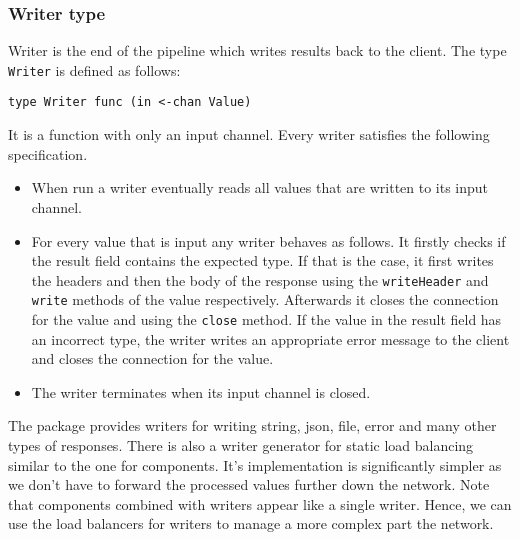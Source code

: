 \subsubsection{Writer type}
Writer is the end of the pipeline which writes results back to the client.
The type \texttt{Writer} is defined as follows:
\begin{lstlisting}
type Writer func (in <-chan Value)
\end{lstlisting}
It is a function with only an input channel.
Every writer satisfies the following specification.
\begin{itemize}
    \item When run a writer eventually reads all values that are written 
          to its input channel.

	\item For every value that is input any writer behaves as follows. 
        It firstly checks if the result field contains the expected type. 
        If that is the case, it first writes the headers and then
        the body of the response using the \texttt{writeHeader} and
        \texttt{write} methods of the value respectively. 
        Afterwards it closes the connection for the value and using 
        the \texttt{close} method. If the value in the result 
        field has an incorrect type, the writer writes an appropriate 
        error message to the client and closes the connection for the value. 

	\item The writer terminates when its input channel is closed.
\end{itemize}
The package provides writers for writing string, json, file, error and many
other types of responses. There is also a writer generator for static
load balancing similar to the one for components. It's implementation
is significantly simpler as we don't have to forward the processed
values further down the network. Note that components
combined with writers appear like a single writer. Hence, we can use the
load balancers for writers to manage a more complex part the network.

